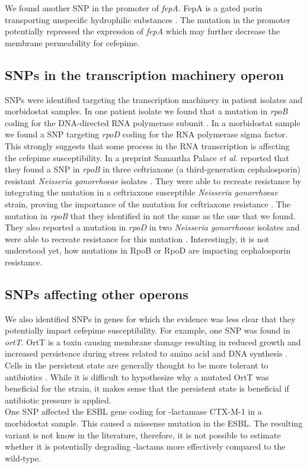 We found another SNP in the promoter of \textit{fepA}. FepA is a gated porin transporting unspecific hydrophilic substances \cite{liu_permeability_1993}. The mutation in the promoter potentially repressed the expression of \textit{fepA} which may further decrease the membrane permeability for cefepime. 

\subsection{SNPs in the transcription machinery operon}
SNPs were identified targeting the transcription machinery in patient isolates and morbidostat samples. In one patient isolate we found that a mutation in \textit{rpoB} coding for the DNA-directed RNA polymerase subunit \textbeta. In a morbidostat sample we found a SNP targeting \textit{rpoD} coding for the RNA polymerase sigma factor. This strongly suggests that some process in the RNA transcription is affecting the cefepime susceptibility. In a preprint Samantha Palace \textit{et al.} reported that they found a SNP in \textit{rpoB} in three ceftriaxone (a third-generation cephalosporin) resistant \textit{Neisseria gonorrhoeae} isolates \cite{palace_rna_2019}. They were able to recreate resistance by integrating the mutation in a ceftriaxone susceptible \textit{Neisseria gonorrhoeae} strain, proving the importance of the mutation for ceftriaxone resistance \cite{palace_rna_2019}. The mutation in \textit{rpoB} that they identified in not the same as the one that we found. They also reported a mutation in \textit{rpoD} in two \textit{Neisseria gonorrhoeae} isolates and were able to recreate resistance for this mutation \cite{palace_rna_2019}. Interestingly, it is not understood yet, how mutations in RpoB or RpoD are impacting cephalosporin resistance. 
\subsection{SNPs affecting other operons}
We also identified SNPs in genes for which the evidence was less clear that they potentially impact cefepime susceptibility. For example, one SNP was found in \textit{ortT}. OrtT is a toxin causing membrane damage resulting in reduced growth and increased persistence during stress related to amino acid and DNA synthesis \cite{islam_orphan_2015}.  Cells in the persistent state are generally thought to be more tolerant to antibiotics \cite{islam_orphan_2015}. While it is difficult to hypothesize why a mutated OrtT was beneficial for the strain, it makes sense that the persistent state is beneficial if antibiotic pressure is applied.  \\
One SNP affected the ESBL gene coding for \textbeta-lactamase CTX-M-1 in a morbidostat sample. This caused a missense mutation in the ESBL. The resulting variant is not know in the literature, therefore, it is not possible to estimate whether it is potentially degrading \textbeta-lactams more effectively compared to the wild-type. 
